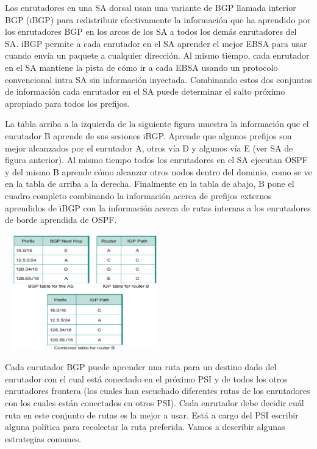 	\par Los enrutadores en una SA dorsal usan una variante de BGP llamada interior BGP (iBGP) para redistribuir efectivamente la información que ha aprendido por los enrutadores BGP en los arcos de los SA a todos los demás enrutadores del SA. iBGP permite a cada enrutador en el SA aprender el mejor EBSA para usar cuando envía un paquete a cualquier dirección. Al mismo tiempo, cada enrutador en el SA mantiene la pista de cómo ir a cada EBSA usando un protocolo convencional intra SA sin información inyectada. Combinando estos dos conjuntos de información cada enrutador en el SA puede determinar el salto próximo apropiado para todos los prefijos.

	\par La tabla arriba a la izquierda de la siguiente figura muestra la información que el enrutador B aprende de sus sesiones iBGP. Aprende que algunos prefijos son mejor alcanzados por el enrutador A, otros vía D y algunos vía E (ver SA de figura anterior). Al mismo tiempo todos los enrutadores en el SA ejecutan OSPF y del mismo B aprende cómo alcanzar otros nodos dentro del dominio, como se ve en la tabla de arriba a la derecha. Finalmente en la tabla de abajo, B pone el cuadro completo combinando la información acerca de prefijos externos aprendidos de iBGP con la información acerca de rutas internas a los enrutadores de borde aprendida de OSPF.
	
	\begin{center}
		\includegraphics[width=7cm, height=5cm]{./imagenes/fig3.png}
	\end{center}

	\par Cada enrutador BGP puede aprender una ruta para un destino dado del enrutador con el cual está conectado en el próximo PSI y de todos los otros enrutadores frontera (los cuales han escuchado diferentes rutas de los enrutadores con los cuales están conectados en otros PSI). Cada enrutador debe decidir cuál ruta en este conjunto de rutas es la mejor a usar. Está a cargo del PSI escribir alguna política para recolectar la ruta preferida. Vamos a describir algunas estrategias comunes.

